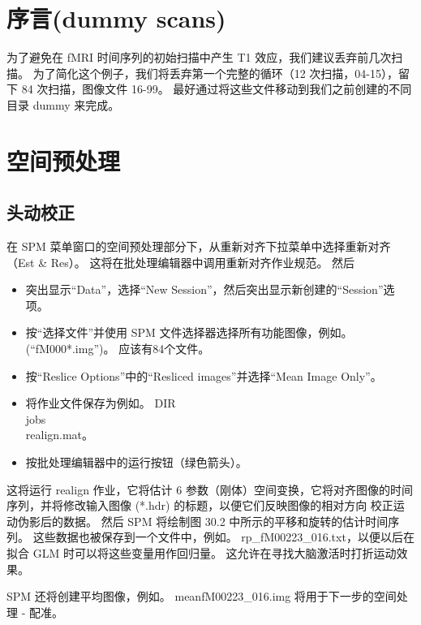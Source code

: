 \section{序言(dummy scans)}
为了避免在 fMRI 时间序列的初始扫描中产生 T1 效应，我们建议丢弃前几次扫描。 为了简化这个例子，我们将丢弃第一个完整的循环（12 次扫描，04-15），留下 84 次扫描，图像文件 16-99。 最好通过将这些文件移动到我们之前创建的不同目录 dummy 来完成。


\section{空间预处理}

\subsection{头动校正}
在 SPM 菜单窗口的空间预处理部分下，从重新对齐下拉菜单中选择重新对齐（Est \& Res）。 这将在批处理编辑器中调用重新对齐作业规范。 然后

\begin{itemize}
	\item 突出显示“Data”，选择“New Session”，然后突出显示新创建的“Session”选项。
	
	\item 按“选择文件”并使用 SPM 文件选择器选择所有功能图像，例如。 (“fM000*.img”)。 应该有84个文件。
	
	\item 按“Reslice Options”中的“Resliced images”并选择“Mean Image Only”。
	
	\item 将作业文件保存为例如。 DIR\\jobs\\realign.mat。
	
	\item 按批处理编辑器中的运行按钮（绿色箭头）。
\end{itemize}


这将运行 realign 作业，它将估计 6 参数（刚体）空间变换，它将对齐图像的时间序列，并将修改输入图像 (*.hdr) 的标题，以便它们反映图像的相对方向 校正运动伪影后的数据。 然后 SPM 将绘制图 30.2 中所示的平移和旋转的估计时间序列。 这些数据也被保存到一个文件中，例如。 rp\_fM00223\_016.txt，以便以后在拟合 GLM 时可以将这些变量用作回归量。 这允许在寻找大脑激活时打折运动效果。

SPM 还将创建平均图像，例如。 meanfM00223\_016.img 将用于下一步的空间处理 - 配准。

